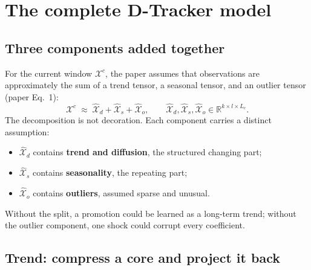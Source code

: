 \section{The complete D-Tracker model}
\label{sec:model}

\subsection{Three components added together}

For the current window $\mathcal{X}^{c}$, the paper assumes that observations are approximately the
sum of a trend tensor, a seasonal tensor, and an outlier tensor (paper Eq.~1):
\begin{equation}
  \mathcal{X}^{c}\;\approx\;\widehat{\mathcal{X}}_d
  +\widehat{\mathcal{X}}_s+\widehat{\mathcal{X}}_o,
  \qquad
  \widehat{\mathcal{X}}_d,\widehat{\mathcal{X}}_s,\widehat{\mathcal{X}}_o
  \in\mathbb{R}^{k\times l\times L_c}.
  \label{eq:model-sum}
\end{equation}
The decomposition is not decoration. Each component carries a distinct assumption:
\begin{itemize}
  \item $\widehat{\mathcal{X}}_d$ contains \textbf{trend and diffusion}, the structured changing part;
  \item $\widehat{\mathcal{X}}_s$ contains \textbf{seasonality}, the repeating part;
  \item $\widehat{\mathcal{X}}_o$ contains \textbf{outliers}, assumed sparse and unusual.
\end{itemize}
Without the split, a promotion could be learned as a long-term trend; without the outlier component,
one shock could corrupt every coefficient.

\subsection{Trend: compress a core and project it back}

